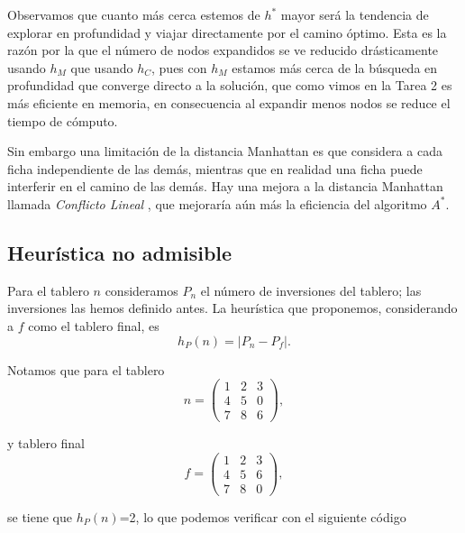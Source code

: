 \documentclass[11pt]{article}
\begin{document}
    Observamos que cuanto más cerca estemos de \(h^*\) mayor será la tendencia de explorar
en profundidad y viajar directamente por el camino óptimo. Esta es la
razón por la que el número de nodos expandidos se ve reducido
drásticamente usando \(h_M\) que usando \(h_C\), pues con \(h_M\)
estamos más cerca de la búsqueda en profundidad que converge directo a
la solución, que como vimos en la Tarea 2 es más eficiente en
memoria, en consecuencia  al expandir menos nodos se reduce el tiempo de cómputo.

    Sin embargo una limitación de la distancia Manhattan es que considera a
cada ficha independiente de las demás, mientras que en realidad una
ficha puede interferir en el camino de las demás. Hay una mejora a la
distancia Manhattan llamada \emph{Conflicto Lineal} \parencite[pp. 423]{rohit}, que mejoraría aún más la eficiencia del algoritmo \(A^*\).

    \hypertarget{heuruxedstica-no-admisible}{%
\subsection{Heurística no admisible}\label{heuruxedstica-no-admisible}}

    Para el tablero \(n\) consideramos \(P_n\) el número de inversiones del tablero; las inversiones las hemos
definido antes. La heurística que proponemos,
considerando a \(f\) como el tablero final, es \begin{equation*}
h_P(n)=|P_n-P_f|.
\end{equation*}

    Notamos que para el tablero
\begin{equation*}n=\begin{pmatrix}1&2&3\\ 4&5&0\\ 7&8&6 \end{pmatrix},\end{equation*}

    y tablero final
\begin{equation*}f=\begin{pmatrix}1&2&3\\ 4&5&6\\ 7&8&0 \end{pmatrix},\end{equation*}

    se tiene que \(h_P(n)\)=2, lo que podemos verificar con el siguiente
código
\end{document}
